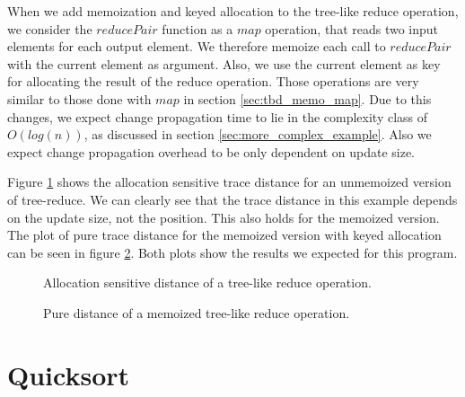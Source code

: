When we add memoization and keyed allocation to the tree-like reduce operation, we consider the $reducePair$ function as a $map$ operation, that reads two input elements for each output element. We therefore memoize each call to $reducePair$ with the current element as argument. Also, we use the current element as key for allocating the result of the reduce operation. Those operations are very similar to those done with $map$ in section \ref{sec:tbd_memo_map}. Due to this changes, we expect change propagation time to lie in the complexity class of $O(log(n))$, as discussed in section \ref{sec:more_complex_example}. Also we expect change propagation overhead to be only dependent on update size. 

Figure \ref{plot:tree_reduce_alloc} shows the allocation sensitive trace distance for an unmemoized version of tree-reduce. We can clearly see that the trace distance in this example depends on the update size, not the position. This also holds for the memoized version. The plot of pure trace distance for the memoized version with keyed allocation can be seen in figure \ref{plot:memo_tree_reduce_pure}. Both plots show the results we expected for this program. 

\begin{figure}
\centering
{}
\caption{Allocation sensitive distance of a tree-like reduce operation.}
\label{plot:tree_reduce_alloc}
\end{figure}



\begin{figure}
\centering
{}
\caption{Pure distance of a memoized tree-like reduce operation.}
\label{plot:memo_tree_reduce_pure}
\end{figure}

\section{Quicksort}

